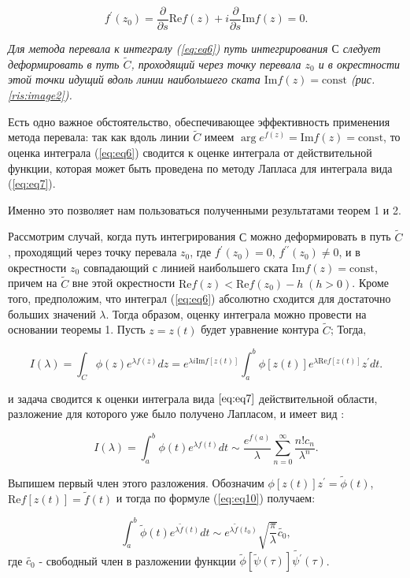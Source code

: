\documentclass[%
bachelor,    %
natbib,      %
subf,        %
href,        %
colorlinks,  %
]{disser}
\renewcommand{\Re}{\mathrm{Re}}
\renewcommand{\Im}{\mathrm{Im}}
\newcommand{\const}{\mathrm{const}}
\begin{document}
	$$
	f^\prime(z_0) = \frac{\partial}{\partial s} \Re f(z) + i\frac{\partial}{\partial s} \Im f(z) = 0.
	$$ 
	
	\textit{Для метода перевала к интегралу (\ref{eq:eq6}) путь интегрирования $С$ следует деформировать в путь $\widetilde{C}$, проходящий через точку перевала $z_0$ и в окрестности этой точки идущий вдоль линии наибольшего ската $\Im f(z) = \const$ (рис. \ref{ris:image2}).}
	
	Есть одно важное обстоятельство, обеспечивающее эффективность применения метода перевала: так как вдоль линии $\widetilde{C}$ имеем $\arg e^{f(z)} = \Im f(z) = \const$, то оценка интеграла (\ref{eq:eq6}) сводится к оценке интеграла от действительной функции, которая может быть проведена по методу Лапласа для интеграла вида (\ref{eq:eq7}).  \cite{Fedoryuk}
	
	Именно это позволяет нам пользоваться полученными результатами теорем 1 и 2. 
	
	Рассмотрим  случай, когда путь интегрирования $С$ можно деформировать в путь $\widetilde{C}$, проходящий через точку перевала $z_0$, где $f^\prime(z_0) = 0$, $f^{\prime\prime}(z_0)\neq0$, и в окрестности $z_0$ совпадающий с линией наибольшего ската $\Im f(z) = \const$, причем на $\widetilde{C}$ вне этой окрестности $\Re f(z) < \Re f(z_0) - h \;(h> 0)$. Кроме того, предположим, что интеграл (\ref{eq:eq6}) абсолютно сходится для достаточно больших значений $\lambda$.
	Тогда образом, оценку интеграла можно провести на основании теоремы 1. Пусть $z = z(t)$ будет уравнение контура $\widetilde{C}$; Тогда,
	
	\begin{equation}\label{eq:eq11}
	I(\lambda) = \int_{C}^{}\phi(z) e^{\lambda f(z)}dz=e^{\lambda i \Im f[z(t)]}\int_{a}^{b}\phi[z(t)]e^{\lambda \Re f[z(t)]}z^{\prime} dt.
	\end{equation}
	
	и задача сводится к оценки интеграла вида $\ref{eq:eq7}$ действительной области, разложение для которого уже было получено Лапласом, и имеет вид \cite{Wong}:
	
	$$
	I(\lambda) = \int_{a}^{b}\phi(t)e^{\lambda f(t)}dt \sim \frac{e^{f(a)}}{\lambda}\sum_{n=0}^{\infty}\frac{n! c_n}{\lambda^n}.
	$$
	
	Выпишем первый член этого разложения. Обозначим $\phi[z(t)]z^\prime = \widetilde{\phi}(t)$, $\Re f[z(t)] = \widetilde{f}(t)$ и тогда по формуле (\ref{eq:eq10}) получаем:
	
	\begin{equation}\label{eq:eq12}
	\int_{a}^{b} \widetilde{\phi}(t) e^{\lambda \widetilde{f}(t)}dt \sim e^{\lambda \widetilde{f}(t_0)} \sqrt{\frac{\pi}{\lambda}} \widetilde{c_0},
	\end{equation}
	где $\widetilde{c_0}$ - свободный член в разложении функции $\widetilde{\phi}[\widetilde{\psi}(\tau)]\widetilde{\psi^\prime}(\tau)$.
	
\end{document}
